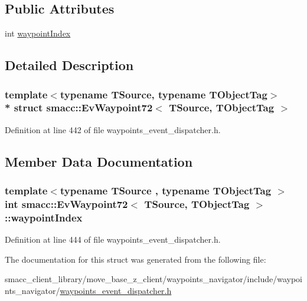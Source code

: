 \subsection*{Public Attributes}
\begin{DoxyCompactItemize}
\item 
int \hyperlink{structsmacc_1_1EvWaypoint72_aa3c9628df96d6ca23bcfccb0ccd56327}{waypoint\+Index}
\end{DoxyCompactItemize}


\subsection{Detailed Description}
\subsubsection*{template$<$typename T\+Source, typename T\+Object\+Tag$>$\\*
struct smacc\+::\+Ev\+Waypoint72$<$ T\+Source, T\+Object\+Tag $>$}



Definition at line 442 of file waypoints\+\_\+event\+\_\+dispatcher.\+h.



\subsection{Member Data Documentation}
\subsubsection[{\texorpdfstring{waypoint\+Index}{waypointIndex}}]{\setlength{\rightskip}{0pt plus 5cm}template$<$typename T\+Source , typename T\+Object\+Tag $>$ int {\bf smacc\+::\+Ev\+Waypoint72}$<$ T\+Source, T\+Object\+Tag $>$\+::waypoint\+Index}\hypertarget{structsmacc_1_1EvWaypoint72_aa3c9628df96d6ca23bcfccb0ccd56327}{}\label{structsmacc_1_1EvWaypoint72_aa3c9628df96d6ca23bcfccb0ccd56327}


Definition at line 444 of file waypoints\+\_\+event\+\_\+dispatcher.\+h.



The documentation for this struct was generated from the following file\+:\begin{DoxyCompactItemize}
\item 
smacc\+\_\+client\+\_\+library/move\+\_\+base\+\_\+z\+\_\+client/waypoints\+\_\+navigator/include/waypoints\+\_\+navigator/\hyperlink{waypoints__event__dispatcher_8h}{waypoints\+\_\+event\+\_\+dispatcher.\+h}\end{DoxyCompactItemize}
